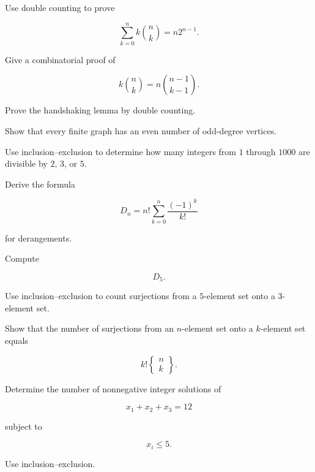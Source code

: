 \begin{exercise}[3]
Use double counting to prove

\[
\sum_{k=0}^{n}
k\binom{n}{k}
=
n2^{n-1}.
\]
\end{exercise}

\begin{exercise}[3]
Give a combinatorial proof of

\[
k\binom{n}{k}
=
n\binom{n-1}{k-1}.
\]
\end{exercise}

\begin{exercise}[3]
Prove the handshaking lemma by double counting.
\end{exercise}

\begin{exercise}[3]
Show that every finite graph has an even number of odd-degree vertices.
\end{exercise}

\begin{exercise}[3]
Use inclusion--exclusion to determine how many integers from \(1\)
through \(1000\) are divisible by \(2\), \(3\), or \(5\).
\end{exercise}

\begin{exercise}[3]
Derive the formula

\[
D_n
=
n!
\sum_{k=0}^{n}
\frac{(-1)^k}{k!}
\]

for derangements.
\end{exercise}

\begin{exercise}[3]
Compute

\[
D_5.
\]
\end{exercise}

\begin{exercise}[3]
Use inclusion--exclusion to count surjections from a \(5\)-element set
onto a \(3\)-element set.
\end{exercise}

\begin{exercise}[3]
Show that the number of surjections from an \(n\)-element set onto a
\(k\)-element set equals

\[
k!
\left\{
\begin{matrix}
n\\
k
\end{matrix}
\right\}.
\]
\end{exercise}

\begin{exercise}[3]
Determine the number of nonnegative integer solutions of

\[
x_1+x_2+x_3=12
\]

subject to

\[
x_i\leq5.
\]

Use inclusion--exclusion.
\end{exercise}

